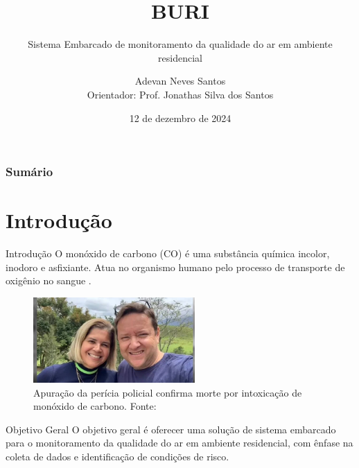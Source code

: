 \documentclass[12pt]{beamer}
\title{BURI}
\subtitle{Sistema Embarcado de monitoramento da qualidade do ar em ambiente residencial}
\author{Adevan Neves Santos \\ Orientador: Prof. Jonathas Silva dos Santos}
\date{12 de dezembro de 2024}
\begin{document}
    \maketitle

    \begin{frame}
        \frametitle{Sumário}
        \tableofcontents
    \end{frame}

    \section{Introdução}

    \begin{frame}{Introdução}
        O monóxido de carbono (CO) é uma substância química incolor, inodoro e asfixiante. Atua no organismo humano pelo processo 
        de transporte de oxigênio no sangue \cite{carbon-monoxide-poisoning-varon}.
        \begin{figure}[ht]
            \centering
            \includegraphics[width=0.55\textwidth]{img/morte-co.jpg}
            \caption{Apuração da perícia policial confirma morte por intoxicação de monóxido de carbono. Fonte: \cite{noticia-manaus-fumaca}}\label{fig:context}
        \end{figure}         
    \end{frame}

    \begin{frame}{Objetivo Geral}
        O objetivo geral é oferecer uma solução de sistema embarcado para o monitoramento
        da qualidade do ar em ambiente residencial, com ênfase na coleta de dados e identificação de
        condições de risco. 
    \end{frame}
\end{document}
